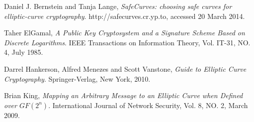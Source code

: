 \begin{thebibliography}{9}
	
		Daniel J. Bernstein and Tanja Lange,
		\emph{SafeCurves: choosing safe curves for elliptic-curve cryptography}.
		http://safecurves.cr.yp.to,
		accessed 20 March 2014.
		
	    Taher ElGamal,
		\emph{A Public Key Cryptosystem and a Signature Scheme Based on Discrete Logarithms}.
		IEEE Transactions on Information Theory, Vol. IT-31, NO. 4,
		July 1985.
	
		Darrel Hankerson, Alfred Menezes and Scott Vanstone,
		\emph{Guide to Elliptic Curve Cryptography}.
		Springer-Verlag, New York,
		2010.
		
		Brian King,
		\emph{Mapping an Arbitrary Message to an Elliptic Curve when Defined over \(GF(2^n)\)}.
		International Journal of Network Security, Vol. 8, NO. 2,
		March 2009.
	
\end{thebibliography}